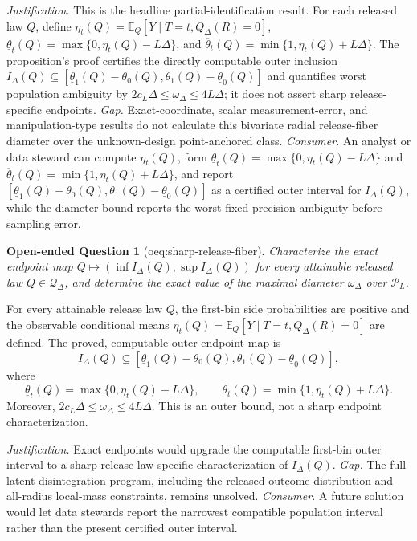 \documentclass{article}
\newtheorem{openendedquestion}{Open-ended Question}
\begin{document}
\par\smallskip\noindent \textit{Justification.} This is the headline partial-identification result. For each released law \(Q\), define \(\eta_t(Q)=\mathbb E_Q[Y\mid T=t,Q_\Delta(R)=0]\), \(\underline{\theta}_t(Q)=\max\{0,\eta_t(Q)-L\Delta\}\), and \(\overline{\theta}_t(Q)=\min\{1,\eta_t(Q)+L\Delta\}\). The proposition's proof certifies the directly computable outer inclusion \(I_\Delta(Q)\subseteq[\underline{\theta}_1(Q)-\overline{\theta}_0(Q),\overline{\theta}_1(Q)-\underline{\theta}_0(Q)]\) and quantifies worst population ambiguity by \(2c_L\Delta\leq\omega_\Delta\leq4L\Delta\); it does not assert sharp release-specific endpoints. \textit{Gap.} Exact-coordinate, scalar measurement-error, and manipulation-type results do not calculate this bivariate radial release-fiber diameter over the unknown-design point-anchored class. \textit{Consumer.} An analyst or data steward can compute \(\eta_t(Q)\), form \(\underline{\theta}_t(Q)=\max\{0,\eta_t(Q)-L\Delta\}\) and \(\overline{\theta}_t(Q)=\min\{1,\eta_t(Q)+L\Delta\}\), and report \([\underline{\theta}_1(Q)-\overline{\theta}_0(Q),\overline{\theta}_1(Q)-\underline{\theta}_0(Q)]\) as a certified outer interval for \(I_\Delta(Q)\), while the diameter bound reports the worst fixed-precision ambiguity before sampling error.

\begin{openendedquestion}[oeq:sharp-release-fiber]\label{oeq:sharp-release-fiber}
Characterize the exact endpoint map \(Q\mapsto(\inf I_\Delta(Q),\sup I_\Delta(Q))\) for every attainable released law \(Q\in\mathcal Q_\Delta\), and determine the exact value of the maximal diameter \(\omega_\Delta\) over \(\mathcal P_L\).
\end{openendedquestion}
For every attainable release law \(Q\), the first-bin side probabilities are positive and the observable conditional means \(\eta_t(Q)=\mathbb E_Q[Y\mid T=t,Q_\Delta(R)=0]\) are defined.  The proved, computable outer endpoint map is
\[
 I_\Delta(Q)\subseteq
 [\underline\theta_1(Q)-\overline\theta_0(Q),
   \overline\theta_1(Q)-\underline\theta_0(Q)],
\]
where
\[
 \underline\theta_t(Q)=\max\{0,\eta_t(Q)-L\Delta\},
 \qquad
 \overline\theta_t(Q)=\min\{1,\eta_t(Q)+L\Delta\}.
\]
Moreover, \(2c_L\Delta\leq\omega_\Delta\leq4L\Delta\).  This is an outer bound, not a sharp endpoint characterization.
\par\smallskip\noindent \textit{Justification.} Exact endpoints would upgrade the computable first-bin outer interval to a sharp release-law-specific characterization of \(I_\Delta(Q)\). \textit{Gap.} The full latent-disintegration program, including the released outcome-distribution and all-radius local-mass constraints, remains unsolved. \textit{Consumer.} A future solution would let data stewards report the narrowest compatible population interval rather than the present certified outer interval.
\end{document}
